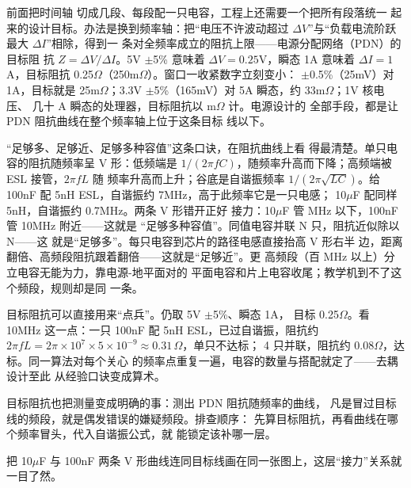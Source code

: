 前面把时间轴
切成几段、每段配一只电容，工程上还需要一个把所有段落统一
起来的设计目标。办法是换到频率轴：把“电压不许波动超过
$\Delta V$”与“负载电流阶跃最大 $\Delta I$”相除，得到一
条对全频率成立的阻抗上限——电源分配网络（PDN）的目标阻
抗 $Z = \Delta V / \Delta I$。5V $\pm$5\% 意味着 $\Delta
V = 0.25$V，瞬态 1A 意味着 $\Delta I = 1$A，目标阻抗
0.25$\Omega$（250m$\Omega$）。窗口一收紧数字立刻变小：
$\pm$0.5\%（25mV）对 1A，目标就是 25m$\Omega$；3.3V
$\pm$5\%（165mV）对 5A 瞬态，约 33m$\Omega$；1V 核电压、
几十 A 瞬态的处理器，目标阻抗以 m$\Omega$ 计。电源设计的
全部手段，都是让 PDN 阻抗曲线在整个频率轴上位于这条目标
线以下。

“足够多、足够近、足够多种容值”这条口诀，在阻抗曲线上看
得最清楚。单只电容的阻抗随频率呈 V 形：低频端是 $1/(2\pi
fC)$，随频率升高而下降；高频端被 ESL 接管，$2\pi f L$ 随
频率升高而上升；谷底是自谐振频率 $1/(2\pi\sqrt{LC})$。给
100nF 配 5nH ESL，自谐振约 7MHz，高于此频率它是一只电感；
10$\mu$F 配同样 5nH，自谐振约 0.7MHz。两条 V 形错开正好
接力：10$\mu$F 管 MHz 以下，100nF 管 10MHz 附近——这就是
“足够多种容值”。同值电容并联 N 只，阻抗近似除以 N——这
就是“足够多”。每只电容到芯片的路径电感直接抬高 V 形右半
边，距离翻倍、高频段阻抗跟着翻倍——这就是“足够近”。更
高频段（百 MHz 以上）分立电容无能为力，靠电源-地平面对的
平面电容和片上电容收尾；教学机到不了这个频段，规则却是同
一条。

目标阻抗可以直接用来“点兵”。仍取 5V $\pm$5\%、瞬态 1A，
目标 0.25$\Omega$。看 10MHz 这一点：一只 100nF 配 5nH
ESL，已过自谐振，阻抗约 $2\pi f L = 2\pi \times 10^{7}
\times 5 \times 10^{-9} \approx 0.31\,\Omega$，单只不达标；
4 只并联，阻抗约 0.08$\Omega$，达标。同一算法对每个关心
的频率点重复一遍，电容的数量与搭配就定了——去耦设计至此
从经验口诀变成算术。

目标阻抗也把测量变成明确的事：测出 PDN 阻抗随频率的曲线，
凡是冒过目标线的频段，就是偶发错误的嫌疑频段。排查顺序：
先算目标阻抗，再看曲线在哪个频率冒头，代入自谐振公式，就
能锁定该补哪一层。

把 10$\mu$F 与 100nF 两条 V 形曲线连同目标线画在同一张图上，这层“接力”关系就一目了然。

